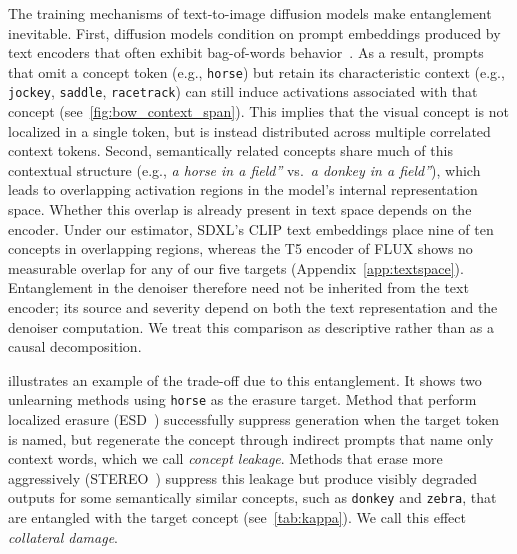 
The training mechanisms of text-to-image diffusion models make entanglement inevitable.
First, diffusion models condition on prompt embeddings produced by text encoders that often exhibit bag-of-words behavior~\citep{yuksekgonul2022and}. As a result, prompts that omit a concept token (e.g., \texttt{horse}) but retain its characteristic context (e.g., \texttt{jockey}, \texttt{saddle}, \texttt{racetrack})
can still induce activations associated with that concept (see~\cref{fig:bow_context_span}). This implies that the visual concept is not localized in a single token, but is instead distributed across multiple correlated context tokens. Second, semantically related concepts share much of this contextual structure (e.g., \emph{a horse in a field''} vs.\ \emph{a donkey in a field''}), which leads to overlapping activation regions in the model’s internal representation space.
Whether this overlap is already present in text space depends on the encoder. Under our estimator, SDXL's CLIP text embeddings place nine of ten concepts in overlapping regions, whereas the T5 encoder of FLUX shows no measurable overlap for any of our five targets (Appendix~\ref{app:textspace}). Entanglement in the denoiser therefore need not be inherited from the text encoder; its source and severity depend on both the text representation and the denoiser computation. We treat this comparison as descriptive rather than as a causal decomposition.

 illustrates an example of the trade-off due to this entanglement. It shows two unlearning methods using \texttt{horse} as the erasure target.
Method that perform localized erasure (ESD~\cite{gandikota2023erasing}) successfully suppress generation when the target token is named, but regenerate the concept through indirect prompts that name only context words, which we call \emph{concept leakage}. 
Methods that erase more aggressively (STEREO~\cite{srivatsan2025stereo}) suppress this leakage but produce visibly degraded outputs for some semantically similar concepts, such as \texttt{donkey} and \texttt{zebra}, that are entangled with the target concept (see~\cref{tab:kappa}). We call this effect \emph{collateral damage}.

